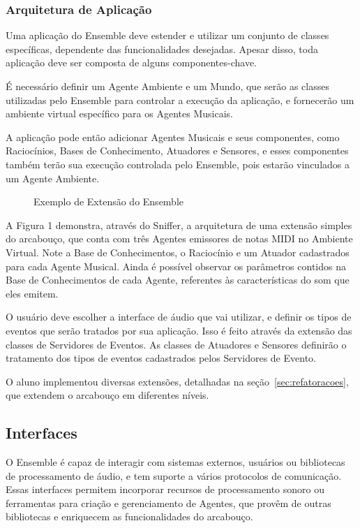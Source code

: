 \documentclass[a4paper, 11pt, twoside]{article}
\begin{document}
\begin{multicols}{2}
\subsubsection{Arquitetura de Aplicação}

Uma aplicação do Ensemble deve estender e utilizar um conjunto de classes
específicas, dependente das funcionalidades desejadas. Apesar disso,
toda aplicação deve ser composta de alguns componentes-chave. 

É necessário definir um Agente Ambiente e um Mundo, que serão as classes
utilizadas pelo Ensemble para controlar a execução da aplicação,
e fornecerão um ambiente virtual específico para os Agentes Musicais.

A aplicação pode então adicionar Agentes Musicais e seus componentes, 
como Raciocínios, Bases de Conhecimento, Atuadores e Sensores, e esses
componentes também terão sua execução controlada pelo Ensemble, pois
estarão vinculados a um Agente Ambiente.

\begin{figure}[H]
  \centering
  \caption{Exemplo de Extensão do Ensemble}
  \label{fig2}
\end{figure}

A Figura 1 demonstra, através do Sniffer, a arquitetura de uma extensão simples
do arcabouço, que conta com três Agentes emissores de notas
MIDI no Ambiente Virtual. Note a Base de Conhecimentos, 
o Raciocínio e um Atuador cadastrados
para cada Agente Musical. Ainda é possível observar os
parâmetros contidos na Base de Conhecimentos de cada
Agente, referentes às características do som que eles emitem.

O usuário deve escolher a interface de áudio que vai utilizar,
e definir os tipos de eventos que serão tratados por sua aplicação.
Isso é feito através da extensão das classes de Servidores de Eventos.
As classes de Atuadores e Sensores definirão o tratamento dos tipos
de eventos cadastrados pelos Servidores de Evento.

O aluno implementou diversas extensões, detalhadas na seção~\ref{sec:refatoracoes},  que extendem
o arcabouço em diferentes níveis. 

\subsection{Interfaces}

O Ensemble é capaz de interagir com sistemas externos, usuários ou 
bibliotecas de processamento de áudio, e tem suporte a vários protocolos de 
comunicação. Essas interfaces permitem incorporar recursos de processamento sonoro 
ou ferramentas para criação e gerenciamento de Agentes, que provêm de outras 
bibliotecas e enriquecem as funcionalidades do arcabouço.


\end{multicols}
\end{document}
